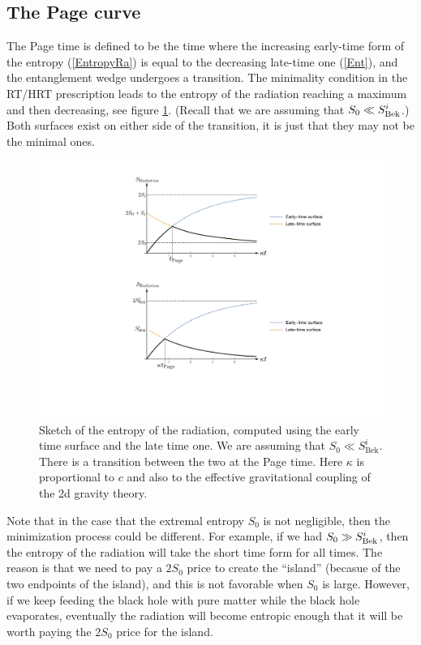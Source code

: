 \documentclass[12pt]{article}
\def\nref#1{(\ref{#1})}
\begin{document}
\subsection{The Page curve}
The Page time \cite{Page:1993wv} is defined to be the time where the increasing early-time form of the entropy \nref{EntropyRa} is equal to the decreasing late-time one \nref{Ent}, and the entanglement wedge undergoes a transition.
The minimality condition in the RT/HRT prescription leads to the entropy of the radiation reaching a maximum and then decreasing, see figure \ref{BHEnt}. 
(Recall that we are assuming that $S_0 \ll S^i_{\rm Bek}$.)
Both surfaces exist on either side of the transition, it is just that they may not be the minimal ones.

\begin{figure}[ht]
    \begin{center}
    \includegraphics[scale=.7]{Figures/RadEnt}
    \end{center}
    \caption{Sketch of the entropy of the radiation, computed using the early time surface and the late time one. 
    We are assuming that $S_0 \ll S^i_\text{Bek}$. 
    There is a transition between the two at the Page time.
    Here $\kappa$ is proportional to $c$ and also to the effective gravitational coupling of the 2d gravity theory.}
    \label{BHEnt}
\end{figure}

Note that in the case that the extremal entropy $S_0$ is not negligible, then the minimization process could be different. 
For example, if we had $S_0 \gg S^i_{\rm Bek}$, then the entropy of the radiation will take the short time form for all times.
The reason is that we need to pay a $2S_0$ price to create the ``island'' (becasue of the two endpoints of the island), and this is not favorable when $S_0$ is large.
However, if we keep feeding the black hole with pure matter while the black hole evaporates, eventually the radiation will become entropic enough that it will be worth paying the $2 S_0$ price for the island.
\end{document}
